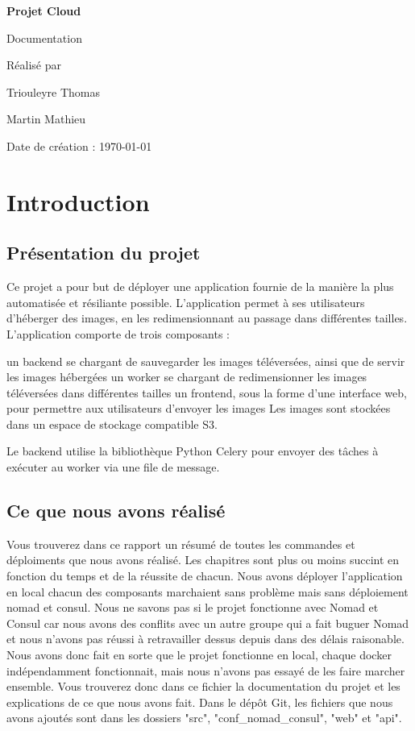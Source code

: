 \documentclass{report}
\begin{document}
\begin{titlepage}
    \centering
    \vspace*{2cm}
    {\Huge\bfseries Projet Cloud\par Documentation}
    \vspace{1cm}
    \vfill
    Réalisé par\par
    Triouleyre Thomas\par
    Martin Mathieu

    \vfill

    {\large Date de création : \today\par}
\end{titlepage}

\tableofcontents

\chapter{Introduction}
\section{Présentation du projet}
Ce projet a pour but de déployer une application fournie de la manière la plus automatisée et résiliante possible. L’application permet à ses utilisateurs d’héberger des images, en les redimensionnant au passage dans différentes tailles.
L’application comporte de trois composants :

un backend se chargant de sauvegarder les images téléversées, ainsi que de servir les images hébergées
un worker se chargant de redimensionner les images téléversées dans différentes tailles
un frontend, sous la forme d’une interface web, pour permettre aux utilisateurs d’envoyer les images
Les images sont stockées dans un espace de stockage compatible S3.

Le backend utilise la bibliothèque Python Celery pour envoyer des tâches à exécuter au worker via une file de message.

\section{Ce que nous avons réalisé}
Vous trouverez dans ce rapport un résumé de toutes les commandes et déploiments que nous avons réalisé. Les chapitres sont plus ou moins succint en fonction du temps et de la réussite de chacun.
Nous avons déployer l'application en local chacun des composants marchaient sans problème mais sans déploiement nomad et consul.
Nous ne savons pas si le projet fonctionne avec Nomad et Consul car nous avons des conflits avec un autre groupe qui a fait buguer Nomad et nous n'avons pas réussi à retravailler dessus depuis dans des délais raisonable. Nous avons donc fait en sorte que le projet fonctionne en local, chaque docker indépendamment fonctionnait, mais nous n'avons pas essayé de les faire marcher ensemble. Vous trouverez donc dans ce fichier la documentation du projet et les explications de ce que nous avons fait. Dans le dépôt Git, les fichiers que nous avons ajoutés sont dans les dossiers "src", "conf\_nomad\_consul", "web" et "api".
\end{document}
